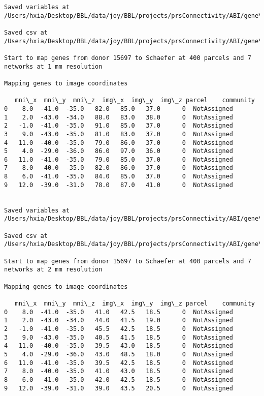 \documentclass[11pt]{article}
\begin{document}
\begin{Verbatim}[commandchars=\\\{\}]
Saved variables at /Users/hxia/Desktop/BBL/data/joy/BBL/projects/prsConnectivity/ABI/gene\_mapping/15697donor\_200Parcels\_17Network\_2mm.pkl

Saved csv at /Users/hxia/Desktop/BBL/data/joy/BBL/projects/prsConnectivity/ABI/gene\_mapping/15697donor\_200Parcels\_17Network\_2mm.csv

Start to map genes from donor 15697 to Schaefer at 400 parcels and 7 networks at 1 mm resolution

Mapping genes to image coordinates

   mni\_x  mni\_y  mni\_z  img\_x  img\_y  img\_z parcel    community
0    8.0  -41.0  -35.0   82.0   85.0   37.0      0  NotAssigned
1    2.0  -43.0  -34.0   88.0   83.0   38.0      0  NotAssigned
2   -1.0  -41.0  -35.0   91.0   85.0   37.0      0  NotAssigned
3    9.0  -43.0  -35.0   81.0   83.0   37.0      0  NotAssigned
4   11.0  -40.0  -35.0   79.0   86.0   37.0      0  NotAssigned
5    4.0  -29.0  -36.0   86.0   97.0   36.0      0  NotAssigned
6   11.0  -41.0  -35.0   79.0   85.0   37.0      0  NotAssigned
7    8.0  -40.0  -35.0   82.0   86.0   37.0      0  NotAssigned
8    6.0  -41.0  -35.0   84.0   85.0   37.0      0  NotAssigned
9   12.0  -39.0  -31.0   78.0   87.0   41.0      0  NotAssigned


Saved variables at /Users/hxia/Desktop/BBL/data/joy/BBL/projects/prsConnectivity/ABI/gene\_mapping/15697donor\_400Parcels\_7Network\_1mm.pkl

Saved csv at /Users/hxia/Desktop/BBL/data/joy/BBL/projects/prsConnectivity/ABI/gene\_mapping/15697donor\_400Parcels\_7Network\_1mm.csv

Start to map genes from donor 15697 to Schaefer at 400 parcels and 7 networks at 2 mm resolution

Mapping genes to image coordinates

   mni\_x  mni\_y  mni\_z  img\_x  img\_y  img\_z parcel    community
0    8.0  -41.0  -35.0   41.0   42.5   18.5      0  NotAssigned
1    2.0  -43.0  -34.0   44.0   41.5   19.0      0  NotAssigned
2   -1.0  -41.0  -35.0   45.5   42.5   18.5      0  NotAssigned
3    9.0  -43.0  -35.0   40.5   41.5   18.5      0  NotAssigned
4   11.0  -40.0  -35.0   39.5   43.0   18.5      0  NotAssigned
5    4.0  -29.0  -36.0   43.0   48.5   18.0      0  NotAssigned
6   11.0  -41.0  -35.0   39.5   42.5   18.5      0  NotAssigned
7    8.0  -40.0  -35.0   41.0   43.0   18.5      0  NotAssigned
8    6.0  -41.0  -35.0   42.0   42.5   18.5      0  NotAssigned
9   12.0  -39.0  -31.0   39.0   43.5   20.5      0  NotAssigned



\end{Verbatim}
\end{document}
